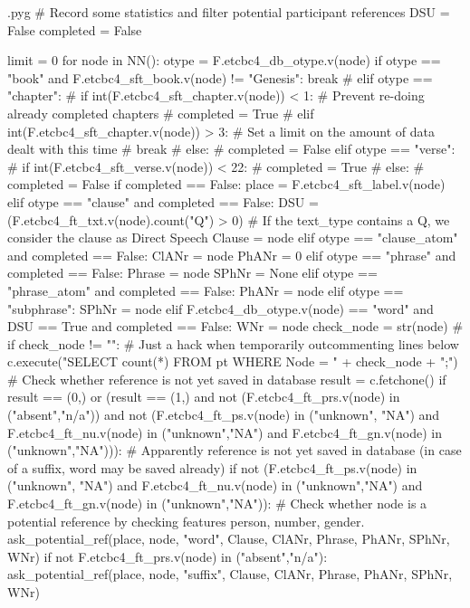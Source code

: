 \documentclass{report}
\makeatletter
\newenvironment{python}{%
  \VerbatimEnvironment
  \minted@resetoptions
  \setkeys{minted@opt}{}
      \begin{VerbatimOut}{\jobname.pyg}}
{%
      \end{VerbatimOut}
      \minted@pygmentize{python}
      \DeleteFile{\jobname.pyg}}
\makeatother
\begin{document}
\begin{python}
# Record some statistics and filter potential participant references
DSU = False
completed = False

limit = 0
for node in NN():
    otype = F.etcbc4_db_otype.v(node)
    if otype == "book" and F.etcbc4_sft_book.v(node) != "Genesis":
        break
#    elif otype == "chapter":
#        if int(F.etcbc4_sft_chapter.v(node)) < 1:    # Prevent re-doing already completed chapters
#            completed = True
#        elif int(F.etcbc4_sft_chapter.v(node)) > 3:    # Set a limit on the amount of data dealt with this time
#            break
#        else:
#            completed = False 
    elif otype == "verse":
#        if int(F.etcbc4_sft_verse.v(node)) < 22:
#           completed = True
#        else:
#           completed = False
        if completed == False:
            place = F.etcbc4_sft_label.v(node)
    elif otype == "clause" and completed == False:
        DSU = (F.etcbc4_ft_txt.v(node).count("Q") > 0)    # If the text_type contains a Q, we consider the clause as Direct Speech
        Clause = node
    elif otype == "clause_atom" and completed == False:
        ClANr = node
        PhANr = 0
    elif otype == "phrase" and completed == False:
        Phrase = node
        SPhNr = None
    elif otype == "phrase_atom" and completed == False:
        PhANr = node
    elif otype == "subphrase":
        SPhNr = node
    elif F.etcbc4_db_otype.v(node) == "word" and DSU == True and completed == False:
        WNr = node
        check_node = str(node)
#        if check_node != "":     # Just a hack when temporarily outcommenting lines below
        c.execute("SELECT count(*) FROM pt WHERE Node = " + check_node + ";") # Check whether reference is not yet saved in database
        result = c.fetchone()
        if result == (0,) or (result == (1,) and not (F.etcbc4_ft_prs.v(node) in ("absent","n/a")) and not (F.etcbc4_ft_ps.v(node) in ("unknown", "NA") and F.etcbc4_ft_nu.v(node) in ("unknown","NA") and F.etcbc4_ft_gn.v(node) in ("unknown","NA"))):    # Apparently reference is not yet saved in database (in case of a suffix, word may be saved already)
            if not (F.etcbc4_ft_ps.v(node) in ("unknown", "NA") and F.etcbc4_ft_nu.v(node) in ("unknown","NA") and F.etcbc4_ft_gn.v(node) in ("unknown","NA")):    # Check whether node is a potential reference by checking features person, number, gender.
                ask_potential_ref(place, node, "word", Clause, ClANr, Phrase, PhANr, SPhNr, WNr)
            if not F.etcbc4_ft_prs.v(node) in ("absent","n/a"):
                ask_potential_ref(place, node, "suffix", Clause, ClANr, Phrase, PhANr, SPhNr, WNr)

\end{python}
\end{document}
